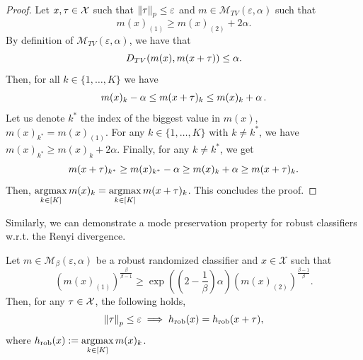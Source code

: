 \begin{proof}
Let $x ,{\tau}  \in \mathcal{X}$ such that $\norm{{\tau}}_p \leq \varepsilon$ and $m  \in \mathcal{M}_{TV}\left(\varepsilon,\alpha\right)$
such that $$m (x )_{(1)} \geq m (x )_{(2)} +2\alpha.$$ By definition of $\mathcal{M}_{TV}\left(\varepsilon,\alpha\right)$, we have that $$D_{TV}(m (x ),m (x +{\tau}))\leq\alpha.$$ Then, for all $k \in \{1, \dots, K\}$ we have $$m (x)_{k}-\alpha\leq m (x +{\tau})_{k}\leq m (x )_{k}+\alpha \thinspace.$$ 
Let us denote $k^*$ the index of the biggest value in $m (x )$, \ie~$m (x )_{k^*} =m (x )_{(1)}$. For any $k\in \{1, \dots, K\}$ with $k \neq k^*$, we have $m (x )_{k^*} \geq m (x )_{k} + 2\alpha$. Finally, for any $k \neq k^*$, we get $$m (x +{\tau})_{k^*}\geq m (x )_{k^*}-\alpha\geq m (x )_{k}+\alpha\geq m (x +{\tau})_{k}.$$
Then, $\operatorname*{argmax}\limits_{k \in [K]}m (x )_{k}=\operatorname*{argmax}\limits_{k \in [K]}m (x +{\tau})_{k}$. This concludes the proof.
\end{proof}
Similarly, we can demonstrate a mode preservation property for robust classifiers w.r.t. the Renyi divergence. 
\begin{prop} Let $m  \in \mathcal{M}_{\beta}\left(\varepsilon,\alpha\right)$ be a robust randomized classifier and $x  \in \mathcal{X}$ such that  $$\left(m (x )_{(1) }\right)^{\frac{\beta}{\beta - 1}} \geq \exp\left( (2-\frac{1}{\beta}) \alpha \right) \left(m (x )_{(2)}\right)^{\frac{\beta-1}{\beta}}.$$ Then, for any ${\tau} \in \mathcal{X}$, the following holds,
\begin{equation*}
\norm{{\tau}}_p \leq \varepsilon \implies {h}_{\text{rob}}(x ) = {h}_{\text{rob}}(x  + {\tau}), 
\end{equation*}
where ${h}_{\text{rob}}(x ) := \operatorname*{argmax}\limits_{k \in [K]}m (x )_{k}$.
\end{prop}
